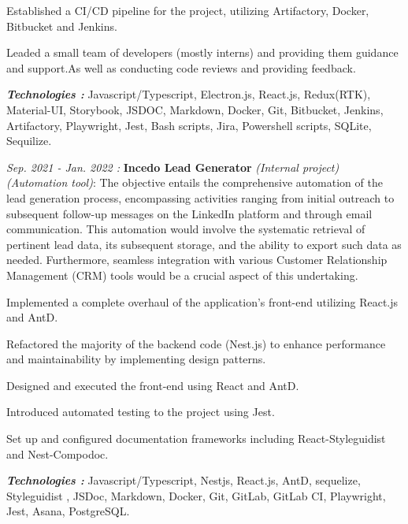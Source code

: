 \begin{cventries}
{\begin{cvitems}
{\begin{cvitems}
          \item {Established a CI/CD pipeline for the project, utilizing Artifactory, Docker, Bitbucket and Jenkins.}
          \item {Leaded a small team of developers (mostly interns) and providing them guidance and support.As well as conducting code reviews and providing feedback.}
        \end{cvitems}
        \vspace{5mm}
        \textbf{\textit{Technologies :}} Javascript/Typescript, Electron.js, React.js, Redux(RTK), Material-UI, Storybook, JSDOC, Markdown, Docker, Git, Bitbucket, Jenkins, Artifactory, Playwright, Jest, Bash scripts, Jira, Powershell scripts, SQLite, Sequilize.
        \vspace{5mm}
        }
        \item {
          \textit{Sep. 2021 - Jan. 2022 : }\textbf{Incedo Lead Generator} \textit{(Internal project)} \textit{(Automation tool)}:
          \newline The objective entails the comprehensive automation of the lead generation process, encompassing activities ranging from initial outreach to subsequent follow-up messages on the LinkedIn platform and through email communication. This automation would involve the systematic retrieval of pertinent lead data, its subsequent storage, and the ability to export such data as needed. Furthermore, seamless integration with various Customer Relationship Management (CRM) tools would be a crucial aspect of this undertaking.
        \vspace{5mm}
      \begin{cvitems}
        \item {Implemented a complete overhaul of the application's front-end utilizing React.js and AntD.}
        \item {Refactored the majority of the backend code (Nest.js) to enhance performance and maintainability by implementing design patterns.}
        \item {Designed and executed the front-end using React and AntD.}
        \item {Introduced automated testing to the project using Jest.}
        \item {Set up and configured documentation frameworks including React-Styleguidist and Nest-Compodoc.}
      \end{cvitems}
      \vspace{5mm}
      \textbf{\textit{Technologies :}} Javascript/Typescript, Nestjs, React.js, AntD, sequelize, Styleguidist , JSDoc, Markdown, Docker, Git, GitLab, GitLab CI, Playwright, Jest, Asana, PostgreSQL.
      \vspace{5mm}}
       \end{cvitems}
    }


\end{cventries}
